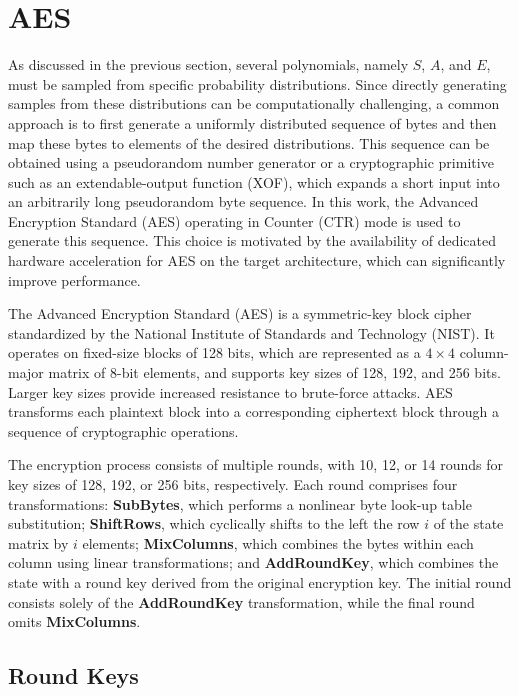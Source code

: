 \section{AES}

As discussed in the previous section, several polynomials, namely \(S\), \(A\), and \(E\), must be sampled from specific probability distributions. Since directly generating samples from these distributions can be computationally challenging, a common approach is to first generate a uniformly distributed sequence of bytes and then map these bytes to elements of the desired distributions. This sequence can be obtained using a pseudorandom number generator or a cryptographic primitive such as an extendable-output function (XOF), which expands a short input into an arbitrarily long pseudorandom byte sequence. In this work, the Advanced Encryption Standard (AES) operating in Counter (CTR) mode is used to generate this sequence. This choice is motivated by the availability of dedicated hardware acceleration for AES on the target architecture, which can significantly improve performance.

The Advanced Encryption Standard (AES) is a symmetric-key block cipher standardized by the National Institute of Standards and Technology (NIST). It operates on fixed-size blocks of 128 bits, which are represented as a \(4 \times 4\) column-major matrix of 8-bit elements, and supports key sizes of 128, 192, and 256 bits. Larger key sizes provide increased resistance to brute-force attacks. AES transforms each plaintext block into a corresponding ciphertext block through a sequence of cryptographic operations.

The encryption process consists of multiple rounds, with 10, 12, or 14 rounds for key sizes of 128, 192, or 256 bits, respectively. Each round comprises four transformations: \textbf{SubBytes}, which performs a nonlinear byte look-up table substitution; \textbf{ShiftRows}, which cyclically shifts to the left the row $i$ of the state matrix by $i$ elements; \textbf{MixColumns}, which combines the bytes within each column using linear transformations; and \textbf{AddRoundKey}, which combines the state with a round key derived from the original encryption key. The initial round consists solely of the \textbf{AddRoundKey} transformation, while the final round omits \textbf{MixColumns}.

\subsection{Round Keys}

